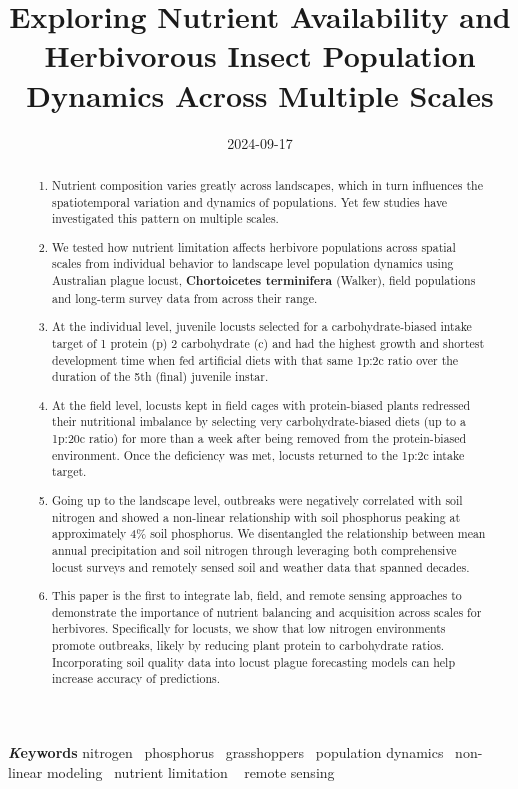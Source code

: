 \documentclass[
]{article}
\title{Exploring Nutrient Availability and Herbivorous Insect Population
Dynamics Across Multiple Scales}
\author{\asep\asep\asep\asep\asep\asep\asep\asep\asep}
\date{2024-09-17}
\begin{document}
\maketitle
\begin{abstract}
\begin{enumerate}
\def\labelenumi{\arabic{enumi}.}
\item
  Nutrient composition varies greatly across landscapes, which in turn
  influences the spatiotemporal variation and dynamics of populations.
  Yet few studies have investigated this pattern on multiple scales.
\item
  We tested how nutrient limitation affects herbivore populations across
  spatial scales from individual behavior to landscape level population
  dynamics using Australian plague locust, \textbf{Chortoicetes
  terminifera} (Walker), field populations and long-term survey data
  from across their range.
\item
  At the individual level, juvenile locusts selected for a
  carbohydrate-biased intake target of 1 protein (p) 2 carbohydrate (c)
  and had the highest growth and shortest development time when fed
  artificial diets with that same 1p:2c ratio over the duration of the
  5th (final) juvenile instar.
\item
  At the field level, locusts kept in field cages with protein-biased
  plants redressed their nutritional imbalance by selecting very
  carbohydrate-biased diets (up to a 1p:20c ratio) for more than a week
  after being removed from the protein-biased environment. Once the
  deficiency was met, locusts returned to the 1p:2c intake target.
\item
  Going up to the landscape level, outbreaks were negatively correlated
  with soil nitrogen and showed a non-linear relationship with soil
  phosphorus peaking at approximately 4\% soil phosphorus. We
  disentangled the relationship between mean annual precipitation and
  soil nitrogen through leveraging both comprehensive locust surveys and
  remotely sensed soil and weather data that spanned decades.
\item
  This paper is the first to integrate lab, field, and remote sensing
  approaches to demonstrate the importance of nutrient balancing and
  acquisition across scales for herbivores. Specifically for locusts, we
  show that low nitrogen environments promote outbreaks, likely by
  reducing plant protein to carbohydrate ratios. Incorporating soil
  quality data into locust plague forecasting models can help increase
  accuracy of predictions.
\end{enumerate}
\end{abstract}
{\bfseries \emph Keywords}
\def\sep{\textbullet\ }
nitrogen \sep phosphorus \sep grasshoppers \sep population
dynamics \sep non-linear modeling \sep nutrient limitation \sep 
remote sensing
\end{document}
